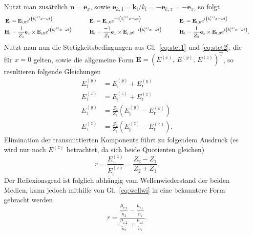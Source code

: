 Nutzt man zusätzlich $\mathbf{n} = \mathbf{e}_{x}$, sowie 
$\mathbf{e}_{k,\,\text{i}} = \mathbf{k}_{\text{i}} / k_{\text{i}} = -\mathbf{e}_{k,\,\text{r}} = -\mathbf{e}_{x}$, 
so folgt
\begin{alignat}{3}
    \mathbf{E}_{\text{i}} &= \mathbf{E}_{\text{i},0}e^{i\left(k^{(x)}_{\text{i}}x-\omega t\right)}
    \hspace{0.8cm}&&\mathbf{E}_{\text{r}} = \mathbf{E}_{\text{r},0}e^{-i\left(k^{(x)}_{\text{i}}x-\omega t\right)}
    \hspace{0.8cm}&&\mathbf{E}_{\text{t}} = \mathbf{E}_{\text{t},0}e^{i\left(k^{(x)}_{\text{t}}x-\omega t\right)} \\
    \mathbf{H}_{\text{i}} &= \frac{1}{Z_{1}}\mathbf{e}_{x}\times\mathbf{E}_{\text{i},0}e^{i\left(k^{(x)}_{\text{i}}x-\omega t\right)}
    \hspace{0.8cm}&&\mathbf{H}_{\text{r}} = \frac{-1}{Z_{1}}\mathbf{e}_{x}\times\mathbf{E}_{\text{r},0}e^{-i\left(k^{(x)}_{\text{i}}x-\omega t\right)}
    \hspace{0.8cm}&&\mathbf{H}_{\text{t}} = \frac{1}{Z_{2}}\mathbf{e}_{x}\times\mathbf{E}_{\text{t},0}e^{i\left(k^{(x)}_{\text{t}}x-\omega t\right)}.
\end{alignat}
Nutzt man nun die Stetigkeitsbedingungen aus Gl.~\eqref{eq:stet1} und \eqref{eq:stet2}, die für $x=0$ gelten, sowie 
die allgemeine Form $\mathbf{E} = \left(E^{(x)},\,E^{(y)},\,E^{(z)}\right)^{\text{T}}$, so resultieren folgende 
Gleichungen
\begin{align}
    E^{(y)}_{\text{t}} &= E^{(y)}_{\text{i}} + E^{(y)}_{\text{r}} \\
    E^{(z)}_{\text{t}} &= E^{(z)}_{\text{i}} + E^{(z)}_{\text{r}} \\
    E^{(y)}_{\text{t}} &= \frac{Z_{2}}{Z_{1}}\left(E^{(y)}_{\text{i}} - E^{(y)}_{\text{r}}\right) \\
    E^{(z)}_{\text{t}} &= \frac{Z_{2}}{Z_{1}}\left(E^{(z)}_{\text{i}} - E^{(z)}_{\text{r}}\right).
\end{align}
Elimination der transmittierten Komponente führt zu folgendem Ausdruck 
(es wird nur noch $E^{(z)}$ betrachtet, da sich beide Quotienten gleichen)
\begin{equation}
    r = \frac{E^{(z)}_{\text{r}}}{E^{(z)}_{\text{i}}} = \frac{Z_{2} - Z_{1}}{Z_{2} + Z_{1}}.
\end{equation}
Der Reflexionsgrad ist folglich abhängig vom Wellenwiederstand der beiden Medien, kann jedoch mithilfe
von Gl.~\eqref{eq:wellwi} in eine bekanntere Form gebracht werden
\begin{equation}
    r = \frac{\frac{\mu_{\text{r,}2}}{\tilde{n}_{2}} - \frac{\mu_{\text{r,}1}}{\tilde{n}_{1}}}{\frac{\mu_{\text{r,}2}}{\tilde{n}_{2}} + \frac{\mu_{\text{r,}1}}{\tilde{n}_{1}}}.
\end{equation}
